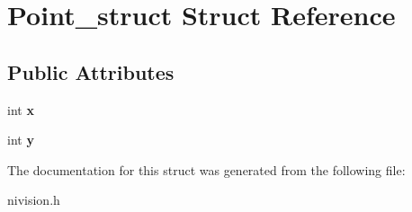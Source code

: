 \hypertarget{structPoint__struct}{
\section{Point\_\-struct Struct Reference}
\label{structPoint__struct}
}
\subsection*{Public Attributes}
\begin{DoxyCompactItemize}
\item 
\hypertarget{structPoint__struct_afb37aa2c67f0991515ba7c6d99a109b6}{
int {\bfseries x}}
\label{structPoint__struct_afb37aa2c67f0991515ba7c6d99a109b6}

\item 
\hypertarget{structPoint__struct_a7a3666129a9e4b4e2559063c06073fd3}{
int {\bfseries y}}
\label{structPoint__struct_a7a3666129a9e4b4e2559063c06073fd3}

\end{DoxyCompactItemize}


The documentation for this struct was generated from the following file:\begin{DoxyCompactItemize}
\item 
nivision.h\end{DoxyCompactItemize}
